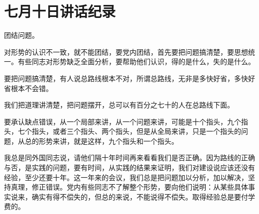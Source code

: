\section[七月十日讲话纪录 ]{七月十日讲话纪录 }


团结问题。

对形势的认识不一致，就不能团结，要党内团结，首先要把问题搞清楚，要思想统一。有些同志对形势缺乏全面分析，要帮助他们认识，得的是什么，失的是什么。

要把问题搞清楚，有人说总路线根本不对，所谓总路线，无非是多快好省，多快好省根本不会错。

我们把道理讲清楚，把问题摆开，总可以有百分之七十的人在总路线下面。

要承认缺点错误，从一个局部来讲，从一个问题来讲，可能是十个指头，九个指头，七个指头，或者三个指头、两个指头，但是从全局来讲，只是一个指头的问题，从总的形势来讲，就是这样，九个指头和一个指头。

我总是同外国同志说，请他们隔十年时间再来看看我们是否正确。因为路线的正确与否，是实践的问题，要有时间，从实践的结果来证明，我们对建设说应该还没有经验，至少还要十年。这一年来的会议，我们总是把问题加以分析，加以解决，坚持真理，修正错误。党内有些同志不了解整个形势，要向他们说明：从某些具体事实说来，确实有得不偿失的，但总的来说，不能说得不偿失。取得经验总是要付学费的。


